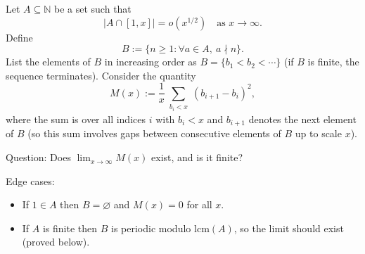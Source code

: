 Let $A\subseteq\mathbb{N}$ be a set such that
\[|A\cap[1,x]| = o(x^{1/2})\quad\text{as }x\to\infty.
\]
Define
\[B := \{ n\ge 1 : \forall a\in A,\ a\nmid n\}.
\]
List the elements of $B$ in increasing order as $B=\{b_1<b_2<\cdots\}$ (if $B$ is finite, the sequence terminates).
Consider the quantity
\[M(x):=\frac{1}{x}\sum_{\substack{b_i<x}}(b_{i+1}-b_i)^2,\]
where the sum is over all indices $i$ with $b_i<x$ and $b_{i+1}$ denotes the next element of $B$ (so this sum involves gaps between consecutive elements of $B$ up to scale $x$).

Question: Does $\lim_{x\to\infty} M(x)$ exist, and is it finite?

Edge cases:
\begin{itemize}
\item If $1\in A$ then $B=\varnothing$ and $M(x)=0$ for all $x$.
\item If $A$ is finite then $B$ is periodic modulo $\mathrm{lcm}(A)$, so the limit should exist (proved below).
\end{itemize}
